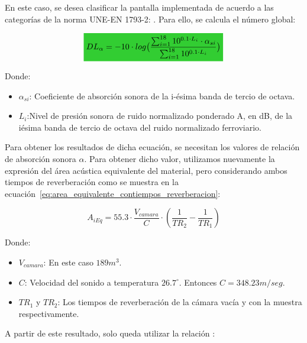 \par En este caso, se desea clasificar la pantalla implementada de acuerdo a las categorías de la norma UNE-EN 1793-2: . Para ello, se calcula el número global:

\begin{equation}
         \mathcolorbox{EQColor}{DL_\alpha = -10\cdot log \big( \frac{\sum_{i=1}^{18} 10^{0.1 \cdot L_i} \cdot \alpha_{si} }{\sum^{18}_{i=1} 10^{0.1 \cdot L_i} }\big)}
    \label{eq:DL_a}
\end{equation}

\par Donde:
\begin{itemize}
    \item $\alpha_{si}$: Coeficiente de absorción sonora de la i-ésima banda de tercio de octava.
    \item $L_i$:Nivel de presión sonora de ruido normalizado ponderado A, en dB, de la iésima banda de tercio de octava del ruido normalizado ferroviario.
\end{itemize}

\par Para obtener los resultados de dicha ecuación, se necesitan los valores de relación de absorción sonora $\alpha$. Para obtener dicho valor, utilizamos nuevamente la expresión del área acústica equivalente del material, pero considerando ambos tiempos de reverberación como se muestra en la ecuación~\eqref{eq:area_equivalente_contiempos_reverberacion}:

\begin{equation}
    A_{iEq} = 55.3 \cdot \frac{V_{camara}}{C} \cdot (\frac{1}{TR_2} - \frac{1}{TR_1})
    \label{eq:area_equivalente_contiempos_reverberacion}
\end{equation}

\par Donde:
\begin{itemize}
    \item $V_{camara}$: En este caso $189m^3$.
    \item $C$: Velocidad del sonido a temperatura $26.7^\circ$. Entonces $C= 348.23 m/seg$.
    \item $TR_1$ y $TR_2$: Los tiempos de reverberación de la cámara vacía y con la muestra respectivamente.
\end{itemize}

\par A partir de este resultado, solo queda utilizar la relación :

